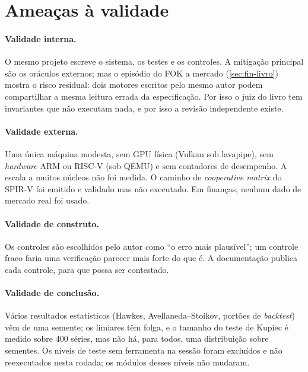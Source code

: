 \section{Ameaças à validade}\label{sec:aval-ameacas}

\paragraph{Validade interna.} O mesmo projeto escreve o sistema, os testes e os controles. A mitigação principal são os oráculos externos; mas o episódio do FOK a mercado (\autoref{sec:fin-livro}) mostra o risco residual: dois motores escritos pelo mesmo autor podem compartilhar a mesma leitura errada da especificação. Por isso o juiz do livro tem invariantes que não executam nada, e por isso a revisão independente existe.

\paragraph{Validade externa.} Uma única máquina modesta, sem GPU física (Vulkan sob lavapipe), sem \textit{hardware} ARM ou RISC-V (sob QEMU) e sem contadores de desempenho. A escala a muitos núcleos não foi medida. O caminho de \textit{cooperative matrix} do SPIR-V foi emitido e validado mas não executado. Em finanças, nenhum dado de mercado real foi usado.

\paragraph{Validade de construto.} Os controles são escolhidos pelo autor como ``o erro mais plausível''; um controle fraco faria uma verificação parecer mais forte do que é. A documentação publica cada controle, para que possa ser contestado.

\paragraph{Validade de conclusão.} Vários resultados estatísticos (Hawkes, Avellaneda--Stoikov, portões de \textit{backtest}) vêm de uma semente; os limiares têm folga, e o tamanho do teste de Kupiec é medido sobre 400 séries, mas não há, para todos, uma distribuição sobre sementes. Os níveis de teste sem ferramenta na sessão foram excluídos e não reexecutados nesta rodada; os módulos desses níveis não mudaram.
